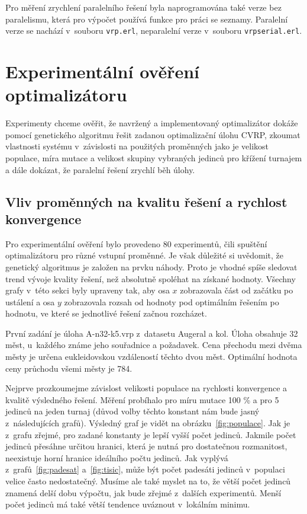 \documentclass[a4paper]{article}
\begin{document}
Pro měření zrychlení paralelního řešení byla naprogramována také verze bez paralelismu, která pro výpočet používá funkce pro práci se seznamy. Paralelní verze se nachází v~souboru {\tt vrp.erl}, neparalelní verze v~sou\-bo\-ru {\tt vrpserial.erl}.

\section{Experimentální ověření optimalizátoru}

Experimenty chceme ověřit, že navržený a implementovaný optimalizátor do\-ká\-že pomocí genetického algoritmu řešit zadanou optimalizační úlohu CVRP, zkoumat vlastnosti systému v~závislosti na použitých proměnných jako je velikost populace, míra mutace a velikost skupiny vybraných jedinců pro křížení turnajem a dále dokázat, že paralelní řešení zrychlí běh úlohy.

\subsection{Vliv proměnných na kvalitu řešení a rychlost konvergence}

Pro experimentální ověření bylo provedeno 80 experimentů, čili spuštění optimalizátoru pro různé vstupní proměnné. Je však důležité si uvědomit, že genetický algoritmus je založen na prvku náhody. Proto je vhodné spíše sledovat trend vývoje kvality řešení, než absolutně spoléhat na získané hodnoty. Všechny grafy v~této sekci byly upraveny tak, aby osa $x$ zobrazovala část od začátku po ustálení a osa $y$ zobrazovala rozsah od hodnoty pod optimálním řešením po hodnotu, ve které se jednotlivé řešení začnou rozcházet.

První zadání je úloha A-n32-k5.vrp z~datasetu Augeral a kol. Úloha obsahuje 32 měst, u~každého známe jeho souřadnice a požadavek. Cena přechodu mezi dvěma městy je určena eukleidovskou vzdáleností těchto dvou měst. Optimální hodnota ceny průchodu všemi městy je 784.

Nejprve prozkoumejme závislost velikosti populace na rychlosti konvergence a kvalitě výsledného řešení. Měření probíhalo pro míru mutace 100 \% a pro 5 jedinců na jeden turnaj (důvod volby těchto konstant nám bude jasný z~ná\-sle\-du\-jí\-cích grafů). Výsledný graf je vidět na obrázku~\ref{fig:populace}. Jak je z~grafu zřejmé, pro zadané konstanty je lepší vyšší počet jedinců. Jakmile počet jedinců přesáhne určitou hranici, která je nutná pro dostatečnou rozmanitost, neexistuje horní hranice ideálního počtu jedinců. Jak vyplývá z~grafů~\ref{fig:padesat} a~\ref{fig:tisic}, může být počet padesáti jedinců v~populaci velice často nedostatečný. Musíme ale také myslet na to, že větší počet jedinců znamená delší dobu výpočtu, jak bude zřejmé z~dalších experimentů. Menší počet jedinců má také větší tendence uváznout v~lokálním minimu.
\end{document}
